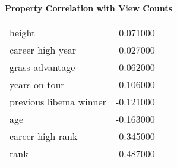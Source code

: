 \textbf{Property Correlation with View Counts}

\begin{tabular}{lr}
\toprule
\midrule
height & 0.071000 \\
career high year & 0.027000 \\
grass advantage & -0.062000 \\
years on tour & -0.106000 \\
previous libema winner & -0.121000 \\
age & -0.163000 \\
career high rank & -0.345000 \\
rank & -0.487000 \\
\bottomrule
\end{tabular}

